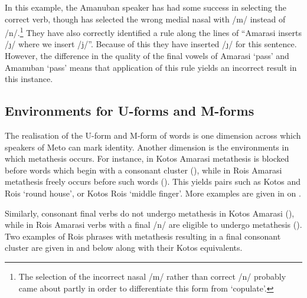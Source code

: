 In this example, the Amanuban speaker has had some success
in selecting the correct verb, though has selected the wrong medial nasal with /m/ instead of /n/.\footnote{
		The selection of the incorrect nasal /m/ rather than correct
		/n/ probably came about partly in order to differentiate
		this form from  `copulate'.}
They have also correctly identified a rule along the lines of
``Amarasi inserts /\j/ where we insert /j/''.
Because of this they have inserted /\j/ for this sentence.
However, the difference in the quality of the final vowels of
Amarasi  `pass' and Amanuban  `pass'
means that application of this rule yields an incorrect result in this instance.

\subsection{Environments for U-forms and M-forms}
The realisation of the U-form and M-form of words
is one dimension across which speakers of Meto can mark identity.
Another dimension is the environments in which metathesis occurs.
For instance, in Kotos Amarasi metathesis is blocked before words
which begin with a consonant cluster (),
while in Ro{\Q}is Amarasi metathesis freely occurs
before such words ().
This yields pairs such as Kotos  and Ro{\Q}is  `round house',
or Kotos  Ro{\Q}is  `middle finger'.
More examples are given in  on .

Similarly, consonant final verbs do not undergo
metathesis in Kotos Amarasi (),
while in Ro{\Q}is Amarasi verbs with a final /n/ are eligible
to undergo metathesis ().
Two examples of Ro{\Q}is phrases with metathesis
resulting in a final consonant cluster are given in 
and  below along with their Kotos equivalents.

\begin{multicols}{2}
	\begin{exe}\let\eachwordtwo=\ve
		\label{ex:08/10/14, p.113 ch:ConCon}
		\label{ex:09/10/14, p.114 ch:ConCon}
	\end{exe}
\end{multicols}

